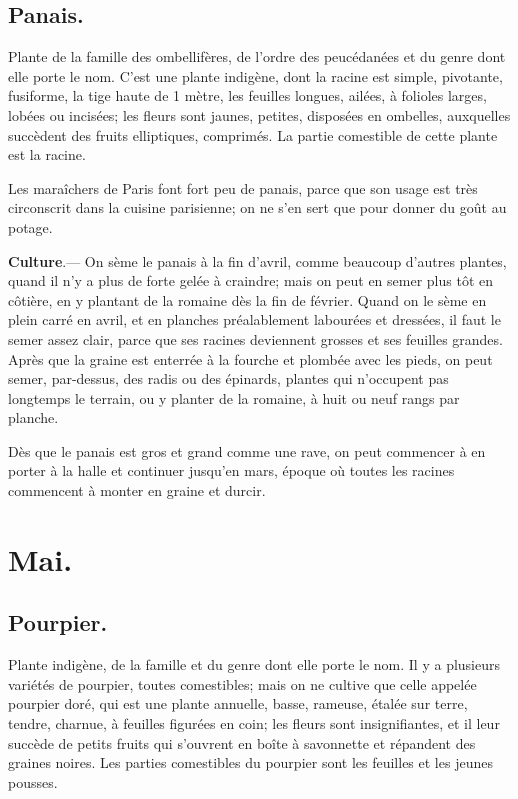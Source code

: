 \documentclass[10pt,a4paper]{book}
\begin{document}
\subsection{Panais.}

Plante de la famille des ombellifères, de l'ordre des peucédanées et du genre dont elle porte le nom. C'est une plante indigène, dont la racine est simple, pivotante, fusiforme, la tige haute de 1 mètre, les feuilles longues, ailées, à folioles larges, lobées ou incisées; les fleurs sont jaunes, petites, disposées en ombelles, auxquelles succèdent des fruits elliptiques, comprimés. La partie comestible de cette plante est la racine.

Les maraîchers de Paris font fort peu de panais, parce que son usage est très circonscrit dans la cuisine parisienne; on ne s'en sert que pour donner du goût au potage.

\textbf{Culture}.--- On sème le panais à la fin d'avril, comme beaucoup d'autres plantes, quand il n'y a plus de forte gelée à craindre; mais on peut en semer plus tôt en côtière, en y plantant de la romaine dès la fin de février. Quand on le sème en plein carré en avril, et en planches préalablement labourées et dressées, il faut le semer assez clair, parce que ses racines deviennent grosses et ses feuilles grandes. Après que la graine est enterrée à la fourche et plombée avec les pieds, on peut semer, par-dessus, des radis ou des épinards, plantes qui n'occupent pas longtemps le terrain, ou y planter de la romaine, à huit ou neuf rangs par planche.

Dès que le panais est gros et grand comme une rave, on peut commencer à en porter à la halle et continuer jusqu'en mars, époque où toutes les racines commencent à monter en graine et durcir.

\section{Mai.}

\subsection{Pourpier.}

Plante indigène, de la famille et du genre dont elle porte le nom. Il y a plusieurs variétés de pourpier, toutes comestibles; mais on ne cultive que celle appelée pourpier doré, qui est une plante annuelle, basse, rameuse, étalée sur terre, tendre, charnue, à feuilles figurées en coin; les fleurs sont insignifiantes, et il leur succède de petits fruits qui s'ouvrent en boîte à savonnette et répandent des graines noires. Les parties comestibles du pourpier sont les feuilles et les jeunes pousses.
\end{document}
